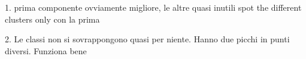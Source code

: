 1.
prima componente ovviamente migliore, le altre quasi inutili
spot the different clusters only con la prima

2.
Le classi non si sovrappongono quasi per niente. Hanno due picchi in punti diversi. 
Funziona bene